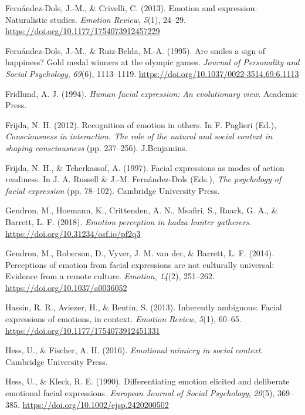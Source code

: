 \documentclass[
  english,
  doc]{apa7}
\newlength{\cslhangindent}
\newenvironment{cslreferences}%
  {\setlength{\parindent}{0pt}%
  \everypar{\setlength{\hangindent}{\cslhangindent}}\ignorespaces}%
  {\par}
\begin{document}
\begin{cslreferences}
\leavevmode\hypertarget{ref-fernandez2013emotion}{}%
Fernández-Dols, J.-M., \& Crivelli, C. (2013). Emotion and expression: Naturalistic studies. \emph{Emotion Review}, \emph{5}(1), 24--29. \url{https://doi.org/10.1177/1754073912457229}

\leavevmode\hypertarget{ref-fernandez1995smiles}{}%
Fernández-Dols, J.-M., \& Ruiz-Belda, M.-A. (1995). Are smiles a sign of happiness? Gold medal winners at the olympic games. \emph{Journal of Personality and Social Psychology}, \emph{69}(6), 1113--1119. \url{https://doi.org/10.1037/0022-3514.69.6.1113}

\leavevmode\hypertarget{ref-fridlund1994human}{}%
Fridlund, A. J. (1994). \emph{Human facial expression: An evolutionary view}. Academic Press.

\leavevmode\hypertarget{ref-frijda2012recognition}{}%
Frijda, N. H. (2012). Recognition of emotion in others. In F. Paglieri (Ed.), \emph{Consciousness in interaction. The role of the natural and social context in shaping consciousness} (pp. 237--256). J.Benjamins.

\leavevmode\hypertarget{ref-frijda1997facial}{}%
Frijda, N. H., \& Tcherkassof, A. (1997). Facial expressions as modes of action readiness. In J. A. Russell \& J.-M. Fernández-Dols (Eds.), \emph{The psychology of facial expression} (pp. 78--102). Cambridge University Press.

\leavevmode\hypertarget{ref-gendron2018emotion}{}%
Gendron, M., Hoemann, K., Crittenden, A. N., Msafiri, S., Ruark, G. A., \& Barrett, L. F. (2018). \emph{Emotion perception in hadza hunter gatherers}. \url{https://doi.org/10.31234/osf.io/pf2q3}

\leavevmode\hypertarget{ref-gendron2014perceptions}{}%
Gendron, M., Roberson, D., Vyver, J. M. van der, \& Barrett, L. F. (2014). Perceptions of emotion from facial expressions are not culturally universal: Evidence from a remote culture. \emph{Emotion}, \emph{14}(2), 251--262. \url{https://doi.org/10.1037/a0036052}

\leavevmode\hypertarget{ref-hassin2013inherently}{}%
Hassin, R. R., Aviezer, H., \& Bentin, S. (2013). Inherently ambiguous: Facial expressions of emotions, in context. \emph{Emotion Review}, \emph{5}(1), 60--65. \url{https://doi.org/10.1177/1754073912451331}

\leavevmode\hypertarget{ref-hess2016emotional}{}%
Hess, U., \& Fischer, A. H. (2016). \emph{Emotional mimicry in social context}. Cambridge University Press.

\leavevmode\hypertarget{ref-hess1990differentiating}{}%
Hess, U., \& Kleck, R. E. (1990). Differentiating emotion elicited and deliberate emotional facial expressions. \emph{European Journal of Social Psychology}, \emph{20}(5), 369--385. \url{https://doi.org/10.1002/ejsp.2420200502}


\end{cslreferences}
\end{document}
